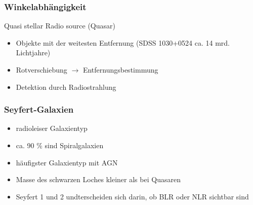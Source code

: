 \documentclass[aspectratio=1610, 9pt]{beamer}
\begin{document}
\begin{frame}\frametitle{Winkelabh\"angigkeit}
  \begin{block}{Quasi stellar Radio source (Quasar)}
    \begin{itemize}
      \item Objekte mit der weitesten Entfernung (SDSS 1030+0524 ca. 14 mrd. Lichtjahre)
      \item Rotverschiebung $\to$ Entfernungsbestimmung
      \item Detektion durch Radiostrahlung
    \end{itemize}
  \end{block}
\end{frame}

\begin{frame}\frametitle{Seyfert-Galaxien}
  \begin{itemize}
    \item radioleiser Galaxientyp
    \item ca. 90 \% sind Spiralgalaxien
    \item h\"aufigster Galaxientyp mit AGN
    \item Masse des schwarzen Loches kleiner als bei Quasaren
    \item Seyfert 1 und 2 undterscheiden sich darin, ob BLR oder NLR sichtbar sind
  \end{itemize}
\end{frame}
\end{document}
